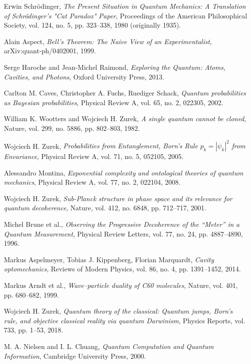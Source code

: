 \documentclass[12pt]{article}
\begin{document}
\begin{thebibliography}{999}
Erwin Schrödinger,
\textit{The Present Situation in Quantum Mechanics: A Translation of Schrödinger's "Cat Paradox" Paper},
Proceedings of the American Philosophical Society, vol. 124, no. 5, pp. 323–338, 1980 (originally 1935).

Alain Aspect,
\textit{Bell’s Theorem: The Naive View of an Experimentalist},
arXiv:quant-ph/0402001, 1999.

Serge Haroche and Jean-Michel Raimond,
\textit{Exploring the Quantum: Atoms, Cavities, and Photons},
Oxford University Press, 2013.

Carlton M. Caves, Christopher A. Fuchs, Ruediger Schack,
\textit{Quantum probabilities as Bayesian probabilities},
Physical Review A, vol. 65, no. 2, 022305, 2002.

William K. Wootters and Wojciech H. Zurek,
\textit{A single quantum cannot be cloned},
Nature, vol. 299, no. 5886, pp. 802–803, 1982.

Wojciech H. Zurek,
\textit{Probabilities from Entanglement, Born's Rule $p_k=|\psi_k|^2$ from Envariance},
Physical Review A, vol. 71, no. 5, 052105, 2005.

Alessandro Montina,
\textit{Exponential complexity and ontological theories of quantum mechanics},
Physical Review A, vol. 77, no. 2, 022104, 2008.

Wojciech H. Zurek,
\textit{Sub-Planck structure in phase space and its relevance for quantum decoherence},
Nature, vol. 412, no. 6848, pp. 712–717, 2001.

Michel Brune et al.,
\textit{Observing the Progressive Decoherence of the “Meter” in a Quantum Measurement},
Physical Review Letters, vol. 77, no. 24, pp. 4887–4890, 1996.

Markus Aspelmeyer, Tobias J. Kippenberg, Florian Marquardt,
\textit{Cavity optomechanics},
Reviews of Modern Physics, vol. 86, no. 4, pp. 1391–1452, 2014.

Markus Arndt et al.,
\textit{Wave–particle duality of C60 molecules},
Nature, vol. 401, pp. 680–682, 1999.

Wojciech H. Zurek,
\textit{Quantum theory of the classical: Quantum jumps, Born’s rule, and objective classical reality via quantum Darwinism},
Physics Reports, vol. 733, pp. 1–53, 2018.

M. A. Nielsen and I. L. Chuang,
\textit{Quantum Computation and Quantum Information},
Cambridge University Press, 2000.


\end{thebibliography}
\end{document}
